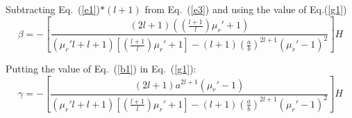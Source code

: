 Subtracting Eq.~(\ref{e1})$*(l+1)$ from Eq.~(\ref{e3}) and using the value of Eq.(\ref{g1})
\begin{equation}\label{bt1}
\beta=-\left[\frac{(2l+1)\left(\left(\frac{l+1}{l}\right)\mu_r'+1\right)}{(\mu_r'l+l+1)\left[\left(\frac{l+1}{l}\right)\mu_r'+1\right]-(l+1)\left(\frac{a}{b}\right)^{2l+1}(\mu_r'-1)^2}\right]H
\end{equation}



Putting the value of Eq.~(\ref{b1}) in Eq.~(\ref{g1}):
\begin{equation}\label{g2}
\gamma=-\left[\frac{(2l+1)a^{2l+1}(\mu_r'-1)}{(\mu_r'l+l+1)\left[\left(\frac{l+1}{l}\right)\mu_r'+1\right]-(l+1)\left(\frac{a}{b}\right)^{2l+1}(\mu_r'-1)^2}\right] H    
\end{equation}


